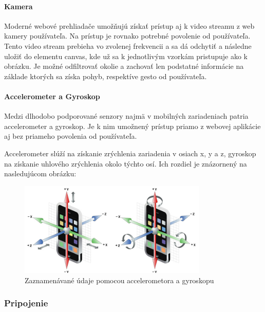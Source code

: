 \paragraph{Kamera} %

Moderné webové prehliadače umožňujú získať prístup aj k video streamu z web kamery používateľa. Na prístup je rovnako potrebné povolenie od používateľa. Tento video stream prebieha vo zvolenej frekvencii a sa dá odchytiť a následne uložiť do elementu canvas, kde už sa k jednotlivým vzorkám pristupuje ako k obrázku. Je možné odfiltrovať okolie a zachovať len podstatné informácie na základe ktorých sa získa pohyb, respektíve gesto od používateľa.


\paragraph{Accelerometer a Gyroskop} %

Medzi dlhodobo podporované senzory najmä v mobilných zariadeniach patria accelerometer a gyroskop. Je k nim umožnený prístup priamo z webovej aplikácie aj bez priameho povolenia od používateľa.

Accelerometer slúží na získanie zrýchlenia zariadenia v osiach x, y a z, gyroskop na získanie uhlového zrýchlenia okolo týchto osí. Ich rozdiel je znázornený na nasledujúcom obrázku:

\begin{figure}[H]
  \centering
  \includegraphics[width=0.8\textwidth]{img/accvsgyro.png}
  \caption[Accelerometor a gyroskop]{
    Zaznamenávané údaje pomocou accelerometora a gyroskopu}
  \label{fig: tnavlaptops}
\end{figure}



\subsubsection{Pripojenie} %
\label{ssub:pripojenie}

